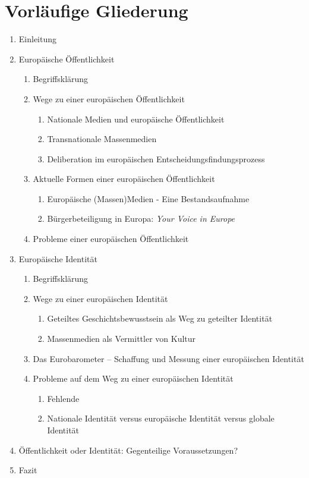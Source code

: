 \documentclass[a4paper, german, oneside]{scrartcl}
\begin{document}
\section{Vorläufige Gliederung}


\begin{enumerate}
	\item Einleitung
	\item Europäische Öffentlichkeit
	\begin{enumerate}
		\item Begriffsklärung
		\item Wege zu einer europäischen Öffentlichkeit
		\begin{enumerate}
			\item Nationale Medien und europäische Öffentlichkeit
			\item Transnationale Massenmedien 
			\item Deliberation im europäischen Entscheidungsfindungsprozess
		\end{enumerate}
		\item Aktuelle Formen einer europäischen Öffentlichkeit
		\begin{enumerate}
			\item Europäische (Massen)Medien - Eine Bestandsaufnahme
			\item Bürgerbeteiligung in Europa: \emph{Your Voice in Europe}
		\end{enumerate}
		\item Probleme einer europäischen Öffentlichkeit
	\end{enumerate}
	\item Europäische Identität
	\begin{enumerate}
		\item Begriffsklärung
		\item Wege zu einer europäischen Identität
		\begin{enumerate}
			\item Geteiltes Geschichtsbewusstsein als Weg zu geteilter Identität
			\item Massenmedien als Vermittler von Kultur
		\end{enumerate}
		\item Das Eurobarometer -- Schaffung und Messung einer europäischen Identität 
		\item Probleme auf dem Weg zu einer europäischen Identität
		\begin{enumerate}
			\item Fehlende
			\item Nationale Identität versus europäische Identität versus globale Identität 
		\end{enumerate}
	\end{enumerate}
	\item Öffentlichkeit oder Identität: Gegenteilige Voraussetzungen?
	\item Fazit
\end{enumerate}
\end{document}
